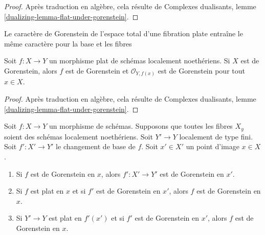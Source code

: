 \begin{proof}
Après traduction en algèbre, cela résulte de Complexes dualisants, lemme \ref{dualizing-lemma-flat-under-gorenstein}.
\end{proof}

\begin{lemma}
\label{lemma-flat-morphism-from-gorenstein-scheme}
\begin{slogan}
Le caractère de Gorenstein de l'espace total d'une fibration plate entraîne le même caractère pour la base et les fibres
\end{slogan}
Soit $f : X \to Y$ un morphisme plat de schémas localement noethériens. Si $X$ est de Gorenstein, alors $f$ est de Gorenstein et $\mathcal{O}_{Y, f(x)}$ est de Gorenstein pour tout $x \in X$.
\end{lemma}

\begin{proof}
Après traduction en algèbre, cela résulte de Complexes dualisants, lemme \ref{dualizing-lemma-flat-under-gorenstein}.
\end{proof}

\begin{lemma}
\label{lemma-base-change-gorenstein}
Soit $f : X \to Y$ un morphisme de schémas. Supposons que toutes les fibres $X_y$ soient des schémas localement noethériens. Soit $Y' \to Y$ localement de type fini. Soit $f' : X' \to Y'$ le changement de base de $f$. Soit $x' \in X'$ un point d'image $x \in X$.
\begin{enumerate}
\item Si $f$ est de Gorenstein en $x$, alors $f' : X' \to Y'$ est de Gorenstein en $x'$.
\item Si $f$ est plat en $x$ et si $f'$ est de Gorenstein en $x'$, alors $f$ est de Gorenstein en $x$.
\item Si $Y' \to Y$ est plat en $f'(x')$ et si $f'$ est de Gorenstein en $x'$, alors $f$ est de Gorenstein en $x$.
\end{enumerate}
\end{lemma}

